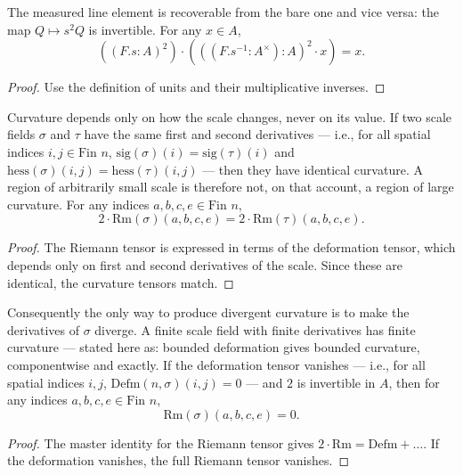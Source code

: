 \begin{theorem}
The measured line element is recoverable from the bare one and vice versa: the map $Q \mapsto s^2 Q$ is invertible. For any $x \in A$,
\[
((F.s : A)^2) \cdot (((F.s^{-1} : A^\times) : A)^2 \cdot x) = x.
\]
\begin{proof}
Use the definition of units and their multiplicative inverses.
\end{proof}
\end{theorem}

\begin{theorem}
Curvature depends only on how the scale changes, never on its value. If two scale fields $\sigma$ and $\tau$ have the same first and second derivatives — i.e., for all spatial indices $i, j \in \text{Fin } n$, $\text{sig}(\sigma)(i) = \text{sig}(\tau)(i)$ and $\text{hess}(\sigma)(i,j) = \text{hess}(\tau)(i,j)$ — then they have identical curvature. A region of arbitrarily small scale is therefore not, on that account, a region of large curvature. For any indices $a, b, c, e \in \text{Fin } n$,
\[
2 \cdot \text{Rm}(\sigma)(a, b, c, e) = 2 \cdot \text{Rm}(\tau)(a, b, c, e).
\]
\begin{proof}
The Riemann tensor is expressed in terms of the deformation tensor, which depends only on first and second derivatives of the scale. Since these are identical, the curvature tensors match.
\end{proof}
\end{theorem}

\begin{theorem}
Consequently the only way to produce divergent curvature is to make the derivatives of $\sigma$ diverge. A finite scale field with finite derivatives has finite curvature — stated here as: bounded deformation gives bounded curvature, componentwise and exactly. If the deformation tensor vanishes — i.e., for all spatial indices $i, j$, $\text{Defm}(n, \sigma)(i,j) = 0$ — and $2$ is invertible in $A$, then for any indices $a, b, c, e \in \text{Fin } n$,
\[
\text{Rm}(\sigma)(a, b, c, e) = 0.
\]
\begin{proof}
The master identity for the Riemann tensor gives $2 \cdot \text{Rm} = \text{Defm} + \ldots$. If the deformation vanishes, the full Riemann tensor vanishes.
\end{proof}
\end{theorem}

